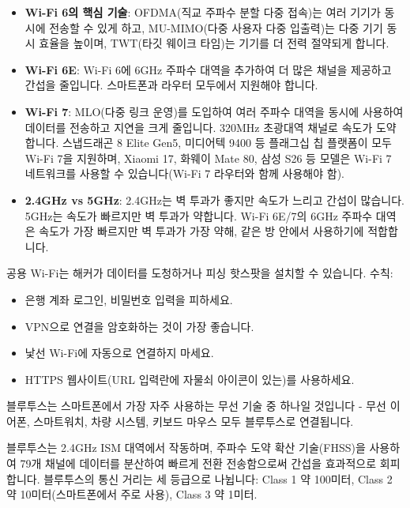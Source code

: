 \begin{itemize}
  \item \textbf{Wi-Fi 6의 핵심 기술}: OFDMA(직교 주파수 분할 다중 접속)는 여러 기기가 동시에 전송할 수 있게 하고, MU-MIMO(다중 사용자 다중 입출력)는 다중 기기 동시 효율을 높이며, TWT(타깃 웨이크 타임)는 기기를 더 전력 절약되게 합니다.
  \item \textbf{Wi-Fi 6E}: Wi-Fi 6에 6GHz 주파수 대역을 추가하여 더 많은 채널을 제공하고 간섭을 줄입니다. 스마트폰과 라우터 모두에서 지원해야 합니다.
  \item \textbf{Wi-Fi 7}: MLO(다중 링크 운영)를 도입하여 여러 주파수 대역을 동시에 사용하여 데이터를 전송하고 지연을 크게 줄입니다. 320MHz 초광대역 채널로 속도가 도약합니다. 스냅드래곤 8 Elite Gen5, 미디어텍 9400 등 플래그십 칩 플랫폼이 모두 Wi-Fi 7을 지원하며, Xiaomi 17, 화웨이 Mate 80, 삼성 S26 등 모델은 Wi-Fi 7 네트워크를 사용할 수 있습니다(Wi-Fi 7 라우터와 함께 사용해야 함).
  \item \textbf{2.4GHz vs 5GHz}: 2.4GHz는 벽 투과가 좋지만 속도가 느리고 간섭이 많습니다. 5GHz는 속도가 빠르지만 벽 투과가 약합니다. Wi-Fi 6E/7의 6GHz 주파수 대역은 속도가 가장 빠르지만 벽 투과가 가장 약해, 같은 방 안에서 사용하기에 적합합니다.
\end{itemize}


공용 Wi-Fi는 해커가 데이터를 도청하거나 피싱 핫스팟을 설치할 수 있습니다. 수칙:

\begin{itemize}
  \item 은행 계좌 로그인, 비밀번호 입력을 피하세요.
  \item VPN으로 연결을 암호화하는 것이 가장 좋습니다.
  \item 낯선 Wi-Fi에 자동으로 연결하지 마세요.
  \item HTTPS 웹사이트(URL 입력란에 자물쇠 아이콘이 있는)를 사용하세요.
\end{itemize}


블루투스는 스마트폰에서 가장 자주 사용하는 무선 기술 중 하나일 것입니다 - 무선 이어폰, 스마트워치, 차량 시스템, 키보드 마우스 모두 블루투스로 연결됩니다.


블루투스는 2.4GHz ISM 대역에서 작동하며, 주파수 도약 확산 기술(FHSS)을 사용하여 79개 채널에 데이터를 분산하여 빠르게 전환 전송함으로써 간섭을 효과적으로 회피합니다. 블루투스의 통신 거리는 세 등급으로 나뉩니다: Class 1 약 100미터, Class 2 약 10미터(스마트폰에서 주로 사용), Class 3 약 1미터.

